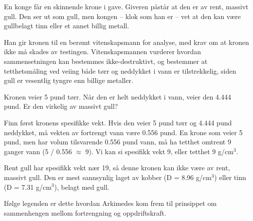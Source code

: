

En konge får en skinnende krone i gave.  Giveren påstår at den er av rent, massivt gull.  Den ser ut som gull, men kongen -- klok som han er -- vet at den kan være gullbelagt tinn eller et annet billig metall.

Han gir kronen til en berømt vitenskapsmann for analyse, med krav om at kronen ikke må skades av testingen.  Vitenskapsmannen vurderer hvordan sammensetningen kan bestemmes ikke-destruktivt, og bestemmer at tetthetsmåling ved veiing både tørr og neddykket i vann er tilstrekkelig, siden gull er vesentlig tyngre enn billige metaller.

Kronen veier 5 pund tørr.  Når den er helt neddykket i vann, veier den 4.444 pund.  Er den virkelig av massivt gull?







Finn først kronens spesifikke vekt.  Hvis den veier 5 pund tørr og 4.444 pund neddykket, må vekten av fortrengt vann være 0.556 pund.  En krone som veier 5 pund, men har volum tilsvarende 0.556 pund vann, må ha tetthet omtrent 9 ganger vann (5 / 0.556 $\approx$ 9).  Vi kan si spesifikk vekt 9, eller tetthet 9 g/cm$^{3}$.

Rent gull har spesifikk vekt nær 19, så denne kronen kan ikke være av rent, massivt gull.  Den er mest sannsynlig laget av kobber (D = 8.96 g/cm$^{3}$) eller tinn (D = 7.31 g/cm$^{3}$), belagt med gull.

\vskip 10pt

Ifølge legenden er dette hvordan Arkimedes kom frem til prinsippet om sammenhengen mellom fortrengning og oppdriftskraft.










